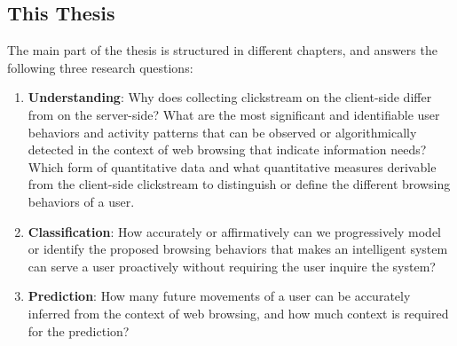 \subsection{This Thesis}


The main part of the thesis is structured in different chapters, and answers the following
three research questions:

\begin{enumerate}
    \item \textbf{Understanding}: Why does collecting clickstream on the client-side differ 
        from on the server-side?
        What are the most significant and identifiable user behaviors and activity patterns 
        that can be observed or algorithmically detected in the context of web browsing that 
        indicate information needs?
        Which form of quantitative data and what quantitative measures derivable 
        from the client-side clickstream to distinguish or define the different 
        browsing behaviors of a user.
    \item \textbf{Classification}: How accurately or affirmatively can we progressively model 
        or identify the proposed browsing behaviors that makes an intelligent system can
        serve a user proactively without requiring the user inquire the system?
    \item \textbf{Prediction}: How many future movements of a user can be accurately inferred 
        from the context of web browsing, and how much context is required for the prediction?

\end{enumerate}

